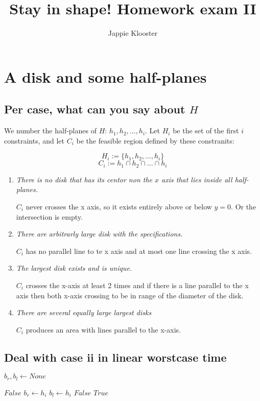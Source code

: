 \documentclass{article}
\begin{document}
\author{Jappie Klooster}
\title{Stay in shape! Homework exam II}
\maketitle
\section{A disk and some half-planes}
\subsection{Per case, what can you say about $H$}
We number the half-planes of $H$: $h_1, h_2,\dots,h_i$.
Let $H_{i}$ be the set of the first $i$ constraints, and
let $C_{i}$ be the feasible region defined by these constranits:

\[ H_i := \{h_1, h_2,\dots, h_i\}\]
\[ C_i := h_1 \cap h_2 \cap \dots \cap h_i\]

\begin{enumerate}[i]
	\item \emph{There is no disk that has its centor non the $x$ axis
			that lies inside all half-planes.}

		$C_i$ never crosses the x axis,
		so it exists entirely above or below $y=0$. Or the intersection is empty.

	\item \emph{There are arbitrarly large disk with the specifications.}

		$C_i$ has no parallel line  to te x axis and
		at most one line crossing the x axis.

	\item \emph{The largest disk exists and is unique.}

		$C_i$ crosses the x-axis at least 2 times and
		if there is a line parallel to the x axis then both x-axis crossing
		to be in range of the diameter of the disk.

	\item \emph{There are several equally large largest disks}

		$C_i$ produces an area with lines parallel to the x-axis.

\end{enumerate}

\newpage
\subsection{Deal with case ii in linear worstcase time}
\begin{algorithmic}[1]
		\State
		$b_r, b_l \gets None$

				\State
				\Return $False$
			\EndIf
			\State
			\State
				$b_r \gets h_i$
			\EndIf
			\State
				$b_l \gets h_i$
			\EndIf
				\State
				\Return $False$
			\EndIf
		\EndFor
		\State
		\Return $True$
	\EndFunction
\end{algorithmic}
\end{document}
